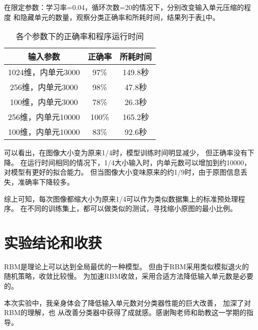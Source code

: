 \documentclass{ctexart}
\begin{document}
在限定参数：学习率=0.04，循环次数=20的情况下，分别改变输入单元压缩的程度
和隐藏单元的数量，观察分类正确率和所耗时间，结果列于表\ref{1}中。

\begin{table}[htbp]
	\centering
	\caption{各个参数下的正确率和程序运行时间}
	\label{1}
	\vspace{0.5em}
	\begin{tabular}{ccc}
		\toprule
		输入参数 & 正确率 & 所耗时间 \\
		\midrule
		1024维，内单元3000 & 97\% & 149.8秒\\
		256维，内单元3000 & 98\% & 47.8秒\\
		100维，内单元3000 & 78\% & 26.3秒\\
		\midrule
		256维，内单元10000 & 100\% & 165.2秒\\
		100维，内单元10000 & 83\% & 92.6秒\\
		\bottomrule
	\end{tabular}
\end{table}

可以看出，在图像大小变为原来1/4时，模型训练时间明显减少，
但正确率没有下降。
在运行时间相同的情况下，1/4大小输入时，内单元数可以增加到约10000，
对模型有更好的拟合能力。
但当图像大小变味原来的约1/9时，由于原图信息丢失，准确率下降较多。

综上可知，每次图像都缩大小为原来1/4可以作为类似数据集上的标准预处理程序。
在不同的训练集上，都可以做类似的测试，寻找缩小原图的最小比例。

\section{实验结论和收获}
RBM是理论上可以达到全局最优的一种模型。
但由于RBM采用类似模拟退火的随机策略，收敛比较慢。
为加速RBM收敛，采用合适方法降低输入单元数是必要的。

本次实验中，我亲身体会了降低输入单元数对分类器性能的巨大改善，
加深了对RBM的理解，也
从改善分类器中获得了成就感。感谢陶老师和助教这一学期的指导。
\end{document}
